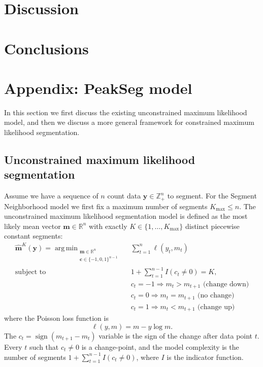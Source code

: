 \documentclass{article}
\DeclareMathOperator*{\argmin}{arg\,min}
\DeclareMathOperator*{\sign}{sign}
\newcommand{\ZZ}{\mathbb Z}
\newcommand{\RR}{\mathbb R}
\begin{document}
\section{Discussion}


\section{Conclusions}







\section{Appendix: PeakSeg model}
\label{sec:model}

In this section we first discuss the existing unconstrained maximum
likelihood model, and then we discuss a more general framework for
constrained maximum likelihood segmentation.

\subsection{Unconstrained maximum likelihood segmentation}

Assume we have a sequence of $n$ count data $\mathbf y\in\ZZ_+^n$ to
segment. For the Segment Neighborhood model we first fix a maximum
number of segments $ K_{\max}\leq n$. The unconstrained maximum
likelihood segmentation model is defined as the most likely mean
vector $\mathbf m\in\RR^n$ with exactly 
$K\in\{1, \dots, K_{\max}\}$ distinct piecewise constant segments:
\begin{align}
  \label{unconstrained}
  \mathbf{\hat m}^K(\mathbf y) =
    \argmin_{\substack{
  \mathbf m\in\RR^{n}
\\
  \mathbf c\in\{-1,0,1\}^{n-1}
  }} &\ \ 
    \sum_{t=1}^n \ell( y_t, m_t) 
\\
    \text{subject to} &\ \  1+\sum_{t=1}^{n-1} I(c_t \neq 0) = K, 
\nonumber\\
& \ \ c_t = -1 \Rightarrow m_{t} > m_{t+1} \text{ (change down)}
\nonumber\\
& \ \ c_t = 0 \Rightarrow m_{t} = m_{t+1}  \text{ (no change)}
\nonumber\\
& \ \ c_t = 1 \Rightarrow m_{t} < m_{t+1} \text{ (change up)}
\nonumber
\end{align}
where the Poisson loss function is
\begin{equation}\label{eq:loss}
  \ell( y, m)= m - y \log m.
\end{equation} 
The $c_t = \sign(m_{t+1} - m_{t})$ variable is the sign of the change
after data point $t$. Every $t$ such that $c_t \neq 0$ is a
change-point, and the model complexity is the number of segments
$1+\sum_{t=1}^{n-1} I(c_t \neq 0)$, where $I$ is the indicator
function. 
\end{document}
